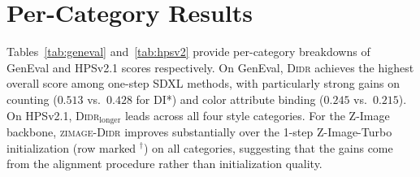 \section{Per-Category Results}
\label{app:geneval}

Tables~\ref{tab:geneval} and~\ref{tab:hpsv2} provide per-category breakdowns of GenEval and HPSv2.1 scores respectively. On GenEval, \textsc{Didr} achieves the highest overall score among one-step SDXL methods, with particularly strong gains on counting ($0.513$ vs.\ $0.428$ for DI*) and color attribute binding ($0.245$ vs.\ $0.215$). On HPSv2.1, \textsc{Didr}$_{\text{longer}}$ leads across all four style categories. For the Z-Image backbone, \textsc{zimage-Didr} improves substantially over the 1-step Z-Image-Turbo initialization (row marked $^\dagger$) on all categories, suggesting that the gains come from the alignment procedure rather than initialization quality.

